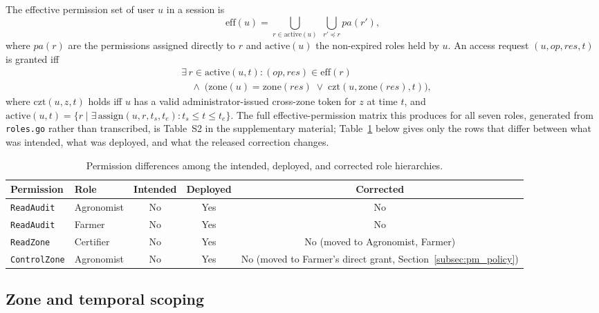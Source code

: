 \documentclass[a4paper,fleqn]{cas-dc}
\begin{document}
The effective permission set of user $u$ in a session is
\begin{equation}
\mathrm{eff}(u) = \bigcup_{r \in \mathrm{active}(u)}
  \; \bigcup_{r' \preceq r} pa(r'),
\end{equation}
where $pa(r)$ are the permissions assigned directly to $r$ and
$\mathrm{active}(u)$ the non-expired roles held by $u$. An access request
$(u, \mathit{op}, \mathit{res}, t)$ is granted iff
\begin{equation}
\begin{aligned}
&\exists\, r \in \mathrm{active}(u,t):
  (\mathit{op},\mathit{res}) \in \mathrm{eff}(r)\\
&\quad \land\;
  \bigl(\mathrm{zone}(u) = \mathrm{zone}(\mathit{res})
  \;\lor\; \mathrm{czt}(u, \mathrm{zone}(\mathit{res}), t)\bigr),
\end{aligned}
\label{eq:grant}
\end{equation}
where $\mathrm{czt}(u,z,t)$ holds iff $u$ has a valid administrator-issued
cross-zone token for $z$ at time $t$, and
$\mathrm{active}(u,t) = \{r \mid \exists\,\mathrm{assign}(u,r,t_s,t_e):
t_s \le t \le t_e\}$. The full effective-permission matrix this produces for
all seven roles, generated from \texttt{roles.go} rather than transcribed,
is Table~S2 in the supplementary material; Table~\ref{tab:permdiff} below
gives only the rows that differ between what was intended, what was
deployed, and what the released correction changes.

\begin{table}[pos=t]
\caption{Permission differences among the intended, deployed, and corrected role hierarchies.}
\label{tab:permdiff}
\small
\begin{tabularx}{\columnwidth}{@{}lXccc@{}}
\toprule
Permission & Role & Intended & Deployed & Corrected \\
\midrule
\texttt{ReadAudit}   & Agronomist & No & Yes & No \\
\texttt{ReadAudit}   & Farmer     & No & Yes & No \\
\texttt{ReadZone}    & Certifier  & No & Yes & No (moved to Agronomist, Farmer) \\
\texttt{ControlZone} & Agronomist & No & Yes & No (moved to Farmer's direct
  grant, Section~\ref{subsec:pm_policy}) \\
\bottomrule
\end{tabularx}
\end{table}

\subsection{Zone and temporal scoping}
\label{subsec:zones}
\end{document}

